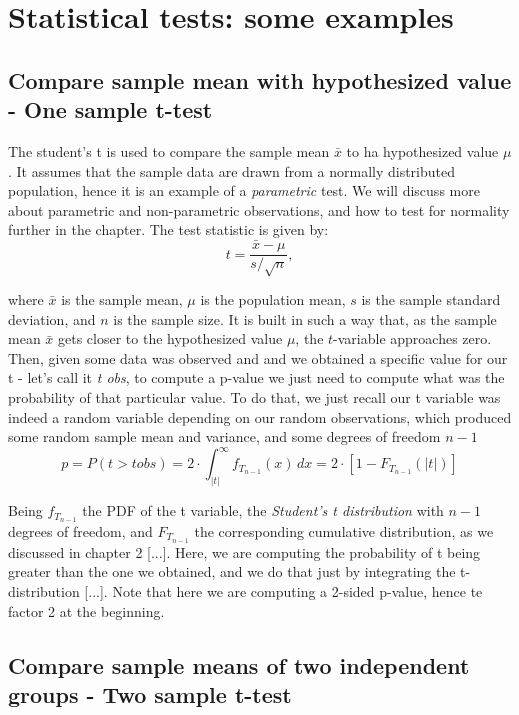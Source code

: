 \documentclass{book}
\begin{document}
\newpage

\section{Statistical tests: some examples}

\subsection{Compare sample mean with hypothesized value - One sample t-test}

The student's t is used to compare the sample mean $\bar{x}$ to ha hypothesized value $\mu$. It assumes that the sample data are drawn from a normally distributed population, hence it is an example of a \textit{parametric} test. We will discuss more about parametric and non-parametric observations, and how to test for normality further in the chapter. The test statistic is given by:
\[
    t = \frac{\bar{x} - \mu}{s / \sqrt{n}},
\]

where $\bar{x}$ is the sample mean, $\mu$ is the population mean, $s$ is the sample standard deviation, and $n$ is the sample size. It is built in such a way that, as the sample mean $\bar{x}$ gets closer to the hypothesized value $\mu$, the $t$-variable approaches zero.\\

Then, given some data was observed and and we obtained a specific value for our t - let's call it \textit{t obs}, to compute a p-value we just need to compute what was the probability of that particular value. To do that, we just recall our t variable was indeed a random variable depending on our random observations, which produced some random sample mean and variance, and some degrees of freedom $n - 1$
\[
p = P\left(t > t obs \right) = 2 \cdot \int_{|t|}^{\infty} f_{T_{n-1}}(x)\,dx = 2 \cdot \left[1 - F_{T_{n-1}}(|t|)\right]
\]

Being $f_{T_{n-1}}$ the PDF of the t variable, the \textit{Student's t distribution} with $n - 1$ degrees of freedom, and $F_{T_{n-1}}$ the corresponding cumulative distribution, as we discussed in chapter 2 [...]. Here, we are computing the probability of t being greater than the one we obtained, and we do that just by integrating the t-distribution [...]. Note that here we are computing a 2-sided p-value, hence te factor 2 at the beginning. 

\newpage

\subsection{Compare sample means of two independent groups - Two sample t-test}
\end{document}
